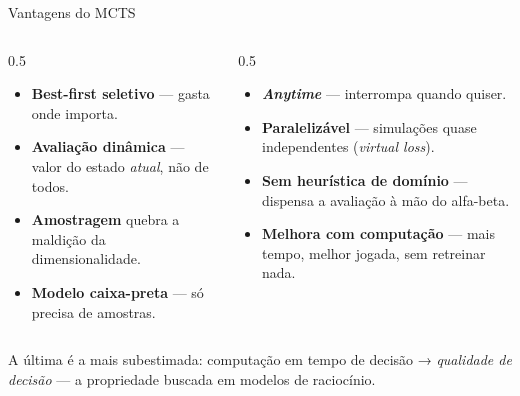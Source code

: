 \documentclass[aspectratio=169, 11pt]{beamer}
\begin{document}
\begin{frame}{Vantagens do MCTS}
  \begin{columns}[T]
    \begin{column}{0.5\textwidth}
      \begin{itemize}
        \item \textbf{Best-first seletivo} --- gasta onde importa.
        \item \textbf{Avaliação dinâmica} --- valor do estado \emph{atual}, não de todos.
        \item \textbf{Amostragem} quebra a maldição da dimensionalidade.
        \item \textbf{Modelo caixa-preta} --- só precisa de amostras.
      \end{itemize}
    \end{column}
    \begin{column}{0.5\textwidth}
      \begin{itemize}
        \item \textbf{\emph{Anytime}} --- interrompa quando quiser.
        \item \textbf{Paralelizável} --- simulações quase independentes (\emph{virtual loss}).
        \item \textbf{Sem heurística de domínio} --- dispensa a avaliação à mão do alfa-beta.
        \item \textbf{Melhora com computação} --- mais tempo, melhor jogada, sem retreinar nada.
      \end{itemize}
    \end{column}
  \end{columns}

  \vspace{0.2em}
  \begin{ideiabox}
    A última é a mais subestimada: computação em tempo de decisão → \emph{qualidade de decisão} — a propriedade buscada em modelos de raciocínio.
  \end{ideiabox}
\end{frame}
\end{document}

